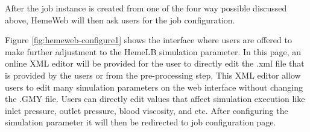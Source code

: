 After the job instance is created from one of the four way possible discussed above, HemeWeb will then ask users for the job configuration. 

\vspace{1cm}

\noindent%
\begin{minipage}{\linewidth}%
\label{fig:hemeweb-configure1}%
\end{minipage}

\vspace{1cm}

Figure \ref{fig:hemeweb-configure1} shows the interface where users are offered to make further adjustment to the HemeLB simulation parameter. In this page, an online XML editor will be provided for the user to directly edit the .xml file that is provided by the users or from the  pre-processing step. This XML editor allow users to edit many simulation parameters on the web interface without changing the .GMY file. Users can directly edit values that affect simulation execution like inlet pressure, outlet pressure, blood viscosity, and etc. After configuring the simulation parameter it will then be redirected to job configuration page.



\vspace{1cm}

\noindent%
\begin{minipage}{\linewidth}%
\label{fig:hemeweb-configure2}%
\end{minipage}


